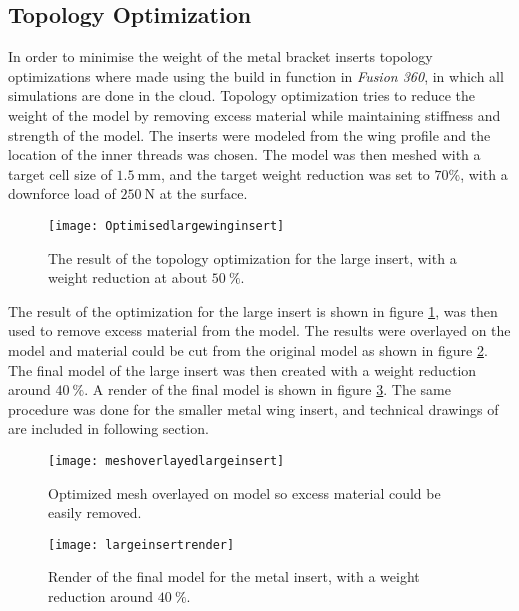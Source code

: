   \subsection{Topology Optimization}

  In order to minimise the weight of the metal bracket inserts topology optimizations where made using the build in function in \emph{Fusion 360}, in which all simulations are done in the cloud. Topology optimization tries to reduce the weight of the model by removing excess material while maintaining stiffness and strength of the model.
  The inserts were modeled from the wing profile and the location of the inner threads was chosen. The model was then meshed with a target cell size of $\SI{1.5}{\milli\metre}$, and the target weight reduction was set to $70\%$, with a downforce load of $\SI{250}{\newton}$ at the surface.

  \begin{figure}
    \texttt{[image: Optimisedlargewinginsert]}
    \caption{The result of the topology optimization for the large insert, with a weight reduction at about $\SI{50}{\%}$.}
    \label{fig:topology_large_insert}
  \end{figure}

  The result of the optimization for the large insert is shown in figure \ref{fig:topology_large_insert}, was then used to remove excess material from the model. The results were overlayed on the model and material could be cut from the original model as shown in figure
  \ref{fig:meshoverlay}. The final model of the large insert was then created with a weight reduction around $\SI{40}{\%}$. A render of the final model is shown in
  figure \ref{fig:render_large_insert}. The same procedure was done for the smaller metal wing insert, and technical drawings of are included in following section.


  \begin{figure}
    \texttt{[image: meshoverlayedlargeinsert]}
    \caption{Optimized mesh overlayed on model so excess material could be easily removed.}
    \label{fig:meshoverlay}
  \end{figure}

  \begin{figure}
    \texttt{[image: largeinsertrender]}
    \caption{Render of the final model for the metal insert, with a weight reduction around $\SI{40}{\%}$.}
    \label{fig:render_large_insert}
  \end{figure}

